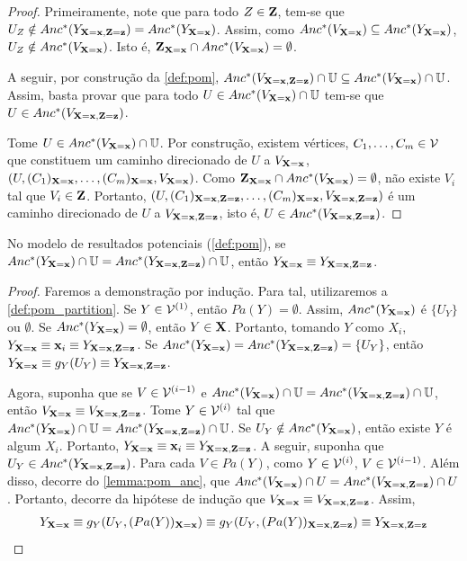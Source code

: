 \begin{proof}
 Primeiramente, note que
 para todo $Z \in \Z$, 
 tem-se que $U_Z \notin Anc^*(Y_{\X=\x,\Z=\z}) = Anc^*(Y_{\X=\x})$.
 Assim, como $Anc^*(V_{\X=\x}) \subseteq Anc^*(Y_{\X=\x})$,
 $U_Z \notin Anc^*(V_{\X=\x})$. Isto é,
 $\Z_{\X=\x} \cap Anc^*(V_{\X=\x}) = \emptyset$.
 
 A seguir, por construção da \cref{def:pom},
 $Anc^*(V_{\X=\x,\Z=\z}) \cap \U \subseteq Anc^*(V_{\X=\x}) \cap \U$.
 Assim, basta provar que para todo $U \in Anc^*(V_{\X=\x}) \cap \U$ 
 tem-se que $U \in Anc^*(V_{\X=\x,\Z=\z})$.
 
 Tome $U \in Anc^*(V_{\X=\x}) \cap \U$.
 Por construção, existem vértices, $C_1,\ldots,C_m \in \sV$ 
 que constituem um caminho direcionado de 
 $U$ a $V_{\X=\x}$,
 $(U,(C_1)_{\X=\x},\ldots,(C_m)_{\X=\x},V_{\X=\x})$.
 Como $\Z_{\X=\x} \cap Anc^*(V_{\X=\x}) = \emptyset$,
 não existe $V_i$ tal que $V_i \in \Z$. Portanto,
 $(U,(C_1)_{\X=\x,\Z=\z},\ldots,(C_m)_{\X=\x},V_{\X=\x,\Z=\z})$ é
 um caminho direcionado de $U$ a $V_{\X=\x,\Z=\z}$, isto é,
 $U \in Anc^*(V_{\X=\x,\Z=\z})$.
\end{proof}

\begin{lemma}
 \label{lemma:pom_equiv_1}
 No modelo de resultados potenciais (\cref{def:pom}),
 se $Anc^*(Y_{\X=\x}) \cap \U = Anc^*(Y_{\X=\x,\Z=\z}) \cap \U$, então
 $Y_{\X=\x} \equiv Y_{\X=\x,\Z=\z}$.
\end{lemma}

\begin{proof}
 Faremos a demonstração por indução.
 Para tal, utilizaremos a \cref{def:pom_partition}.
 Se $Y \in \sV^{(1)}$, então $Pa(Y) = \emptyset$.
 Assim, $Anc^*(Y_{\X=\x})$ é $\{U_Y\}$ ou $\emptyset$.
 Se $Anc^*(Y_{\X=\x}) = \emptyset$, 
 então $Y \in \X$. Portanto, tomando $Y$ como $X_i$,
 $Y_{\X=\x} \equiv \x_i \equiv Y_{\X=\x,\Z=\z}$.
 Se $Anc^*(Y_{\X=\x}) = Anc^*(Y_{\X=\x,\Z=\z}) = \{U_Y\}$, então
 $Y_{\X=\x} \equiv g_Y(U_Y) \equiv Y_{\X=\x,\Z=\z}$.
 
 Agora, suponha que se $V \in \sV^{(i-1)}$ e
 $Anc^*(V_{\X=\x}) \cap \U = Anc^*(V_{\X=\x,\Z=\z}) \cap \U$, então
 $V_{\X=\x} \equiv V_{\X=\x,\Z=\z}$. 
 Tome $Y \in \sV^{(i)}$ tal que
 $Anc^*(Y_{\X=\x}) \cap \U = Anc^*(Y_{\X=\x,\Z=\z}) \cap \U$.
 Se $U_Y \notin Anc^*(Y_{\X=\x})$, então
 existe $Y$ é algum $X_i$. Portanto,
 $Y_{\X=\x} \equiv \x_i \equiv Y_{\X=\x,\Z=\z}$.
 A seguir, suponha que $U_Y \in Anc^*(Y_{\X=\x,\Z=\z})$.
 Para cada $V \in Pa(Y)$, como $Y \in \sV^{(i)}$, 
 $V \in \sV^{(i-1)}$.
 Além disso, decorre do \cref{lemma:pom_anc}, que 
 $Anc^*(V_{\X=\x}) \cap U = Anc^*(V_{\X=\x,\Z=\z}) \cap U$.
 Portanto, decorre da hipótese de indução que
 $V_{\X=\x} \equiv V_{\X=\x,\Z=\z}$. Assim,
 \begin{align*}
  Y_{\X=\x} 
  \equiv g_Y(U_Y, (Pa(Y))_{\X=\x})
  \equiv g_Y(U_Y, (Pa(Y))_{\X=\x,\Z=\z})
  \equiv Y_{\X=\x,\Z=\z}
 \end{align*}
\end{proof}

